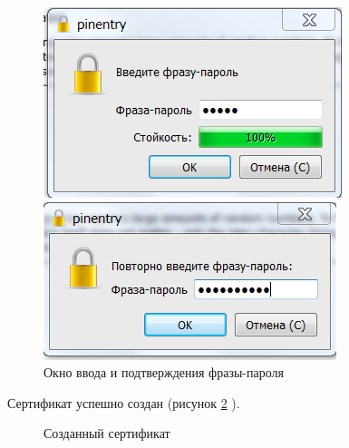\documentclass[10pt,a4paper]{report}
\begin{document}
\begin{figure}[h]
\parbox[b]{0.3\linewidth}
{\centering
    \includegraphics{image/3}}
\hspace*{\fill}
\parbox[b]{0.3\linewidth}
{\centering
\includegraphics{image/4}}
 \caption{Окно ввода и подтверждения фразы-пароля}
\label{ris:image3}
\end{figure}

Сертификат успешно создан (рисунок  \ref{ris:image4} ).
\begin{figure}[h]
\caption{Созданный сертификат}
\label{ris:image4}
\end{figure}
\end{document}
